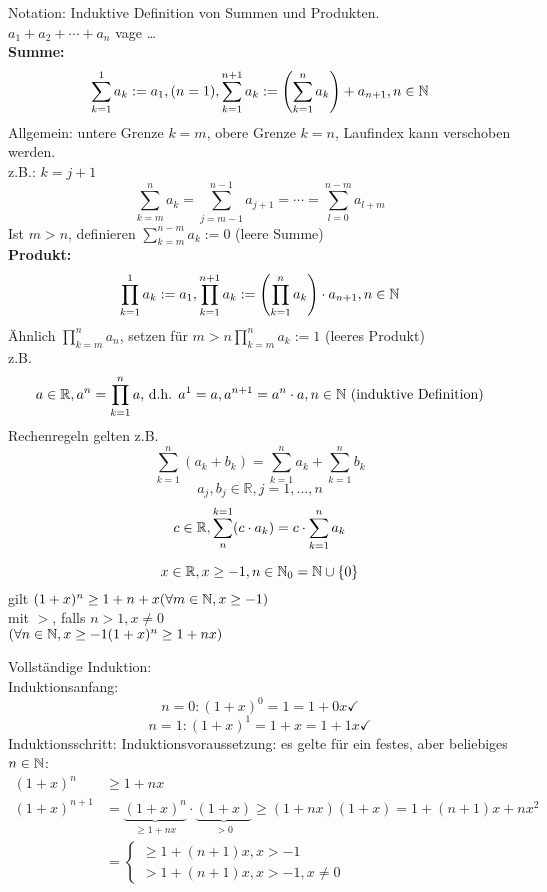 \documentclass[../ana1.tex]{subfiles}
\begin{document}
Notation: Induktive Definition von Summen und Produkten.\\
\(a_1+a_2+\cdots + a_n\) vage \dots \\
\textbf{Summe:} \[\sum_{k=1}^{1} a_k := a_1, (n = 1), \sum_{k=1}^{n+1} a_k := \left( \sum_{k=1}^{n} a_k\right) + a_{n+1}, n\in\mathbb{N} \]
Allgemein: untere Grenze \(k=m\), obere Grenze \(k=n\), Laufindex kann verschoben werden.\\
z.B.: \(k= j+1\)
\[\sum_{k=m}^{n}a_k = \sum_{j=m-1}^{n-1}a_{j+1} = \cdots = \sum_{l = 0}^{n-m}a_{l+m}\]
Ist \(m>n\), definieren \( \sum_{k=m}^{n-m}a_k := 0\) (leere Summe)\\
\textbf{Produkt:} \[ \prod_{k=1}^{1}a_k := a_1, \prod_{k=1}^{n+1}a_k := \left( \prod_{k=1}^{n}a_k\right) \cdot a_{n+1}, n\in\mathbb{N} \]
Ähnlich \( \prod_{k=m}^{n}a_n\), setzen für \(m>n \prod_{k=m}^n a_k := 1\) (leeres Produkt)\\
z.B. \[a\in\mathbb{R}, a^n = \prod_{k=1}^n a \text{, d.h. } a^1=a, a^{n+1} = a^n \cdot a, n\in\mathbb{N} \text{ (induktive Definition)}\]
Rechenregeln gelten z.B. \[ \sum_{k=1}^{n} (a_k+b_k) = \sum_{k=1}^{n} a_k + \sum_{k=1}^{n} b_k\]
\[a_j, b_j \in\mathbb{R}, j=1,\ldots, n\]
\[c \in\mathbb{R}, \sum_{n}^{k=1} (c\cdot a_k) = c\cdot \sum_{k=1}^{n} a_k\]
\begin{satz}
	\[x\in\mathbb{R}, x\geq -1, n\in\mathbb{N}_0 = \mathbb{N}\cup \{0\} \]
	gilt \((1+x)^n \geq 1+ n + x (\forall m\in\mathbb{N},x\geq -1)\) \\
	mit \glqq{}\(>\)\grqq, falls \(n>1, x\neq 0\) \\
	\((\forall n\in\mathbb{N}, x \geq -1(1+x)^n \geq 1 + nx)\)
\end{satz}
\begin{bew}
	Vollständige Induktion:\\
	Induktionsanfang:
	\[n=0: {(1+x)}^0=1=1+0x \checkmark \]
	\[n=1: {(1+x)}^1=1+x=1+1x \checkmark \]
	Induktionsschritt:
	Induktionsvoraussetzung: es gelte für ein festes, aber beliebiges \(n\in\mathbb{N}\):
	\begin{equation*}
		\begin{aligned}
			{(1+x)}^n     & \geq 1+nx \\%
			{(1+x)}^{n+1} & = \underbrace{{(1+x)}^{n}}_{\geq 1+nx} \cdot \underbrace{(1+x)}_{> 0} \geq (1+nx)(1+x) = 1+(n+1)x + nx^2 \\
			              & =\begin{cases}
							\geq 1+(n+1)x, x>-1 \\
							> 1+(n+1)x, x>-1, x\neq 0
							\end{cases}
		\end{aligned}
	\end{equation*}
\end{bew}
\end{document}
